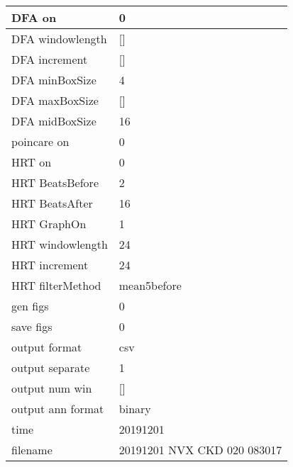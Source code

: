 \begin{tabular}{|l|l|}
DFA on&0\\\hline
DFA windowlength&[]\\\hline
DFA increment&[]\\\hline
DFA minBoxSize&4\\\hline
DFA maxBoxSize&[]\\\hline
DFA midBoxSize&16\\\hline
poincare on&0\\\hline
HRT on&0\\\hline
HRT BeatsBefore&2\\\hline
HRT BeatsAfter&16\\\hline
HRT GraphOn&1\\\hline
HRT windowlength&24\\\hline
HRT increment&24\\\hline
HRT filterMethod&mean5before\\\hline
gen figs&0\\\hline
save figs&0\\\hline
output format&csv\\\hline
output separate&1\\\hline
output num win&[]\\\hline
output ann format&binary\\\hline
time&20191201\\\hline
filename&20191201 NVX CKD 020 083017\\\hline
\end{tabular}
